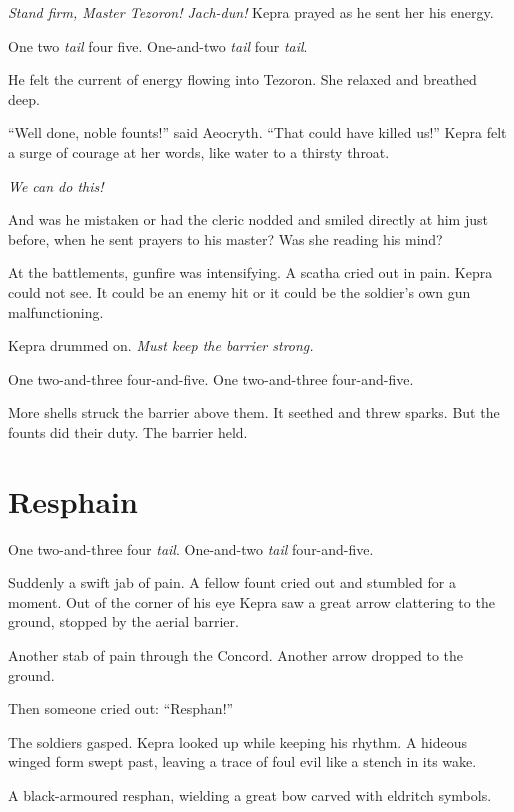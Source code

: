 \documentclass
  [a4paper,
   12pt,
   oneside
  ]%
  {article}
\newcommand{\drum}[1]{\textsf{#1}}
\begin{document}
\emph{Stand firm, Master Tezoron! Jach-dun!} Kepra prayed as he sent her his energy.

\drum{One two \emph{tail} four five. One-and-two \emph{tail} four \emph{tail}.}

He felt the current of energy flowing into Tezoron. She relaxed and breathed deep.

``Well done, noble founts!'' said Aeocryth. ``That could have killed us!'' 
Kepra felt a surge of courage at her words, like water to a thirsty throat. 

\emph{We can do this!}

And was he mistaken or had the cleric nodded and smiled directly at him just before, when he sent prayers to his master? 
Was she reading his mind?

At the battlements, gunfire was intensifying. A scatha cried out in pain. Kepra could not see. It could be an enemy hit or it could be the soldier’s own gun malfunctioning.

Kepra drummed on. 
\emph{Must keep the barrier strong.}

\drum{One two-and-three four-and-five. One two-and-three four-and-five.}

More shells struck the barrier above them. It seethed and threw sparks. But the founts did their duty. The barrier held.



\section{Resphain}
\drum{One two-and-three four \emph{tail}. One-and-two \emph{tail} four-and-five.}\nopagebreak

Suddenly a swift jab of pain. A fellow fount cried out and stumbled for a moment. Out of the corner of his eye Kepra saw a great arrow clattering to the ground, stopped by the aerial barrier.

Another stab of pain through the Concord. 
Another arrow dropped to the ground.

Then someone cried out: ``Resphan!''

The soldiers gasped. Kepra looked up while keeping his rhythm. A hideous winged form swept past, leaving a trace of foul evil like a stench in its wake. 

A black-armoured resphan, wielding a great bow carved with eldritch symbols. 
\end{document}

